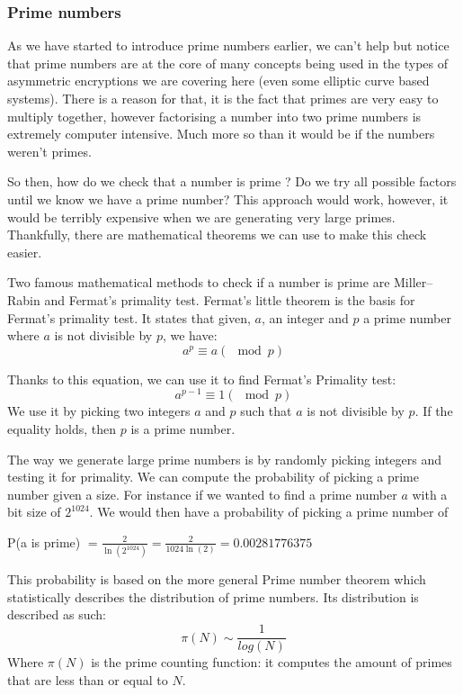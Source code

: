 \documentclass[conference]{IEEEtran}
\begin{document}
\subsubsection*{Prime numbers}
As we have started to introduce prime numbers earlier, we can't help 
but notice that prime numbers are at the core of many concepts being
used in the types of asymmetric encryptions we are covering here 
(even some elliptic curve based systems). 
There is a reason for that, it is the fact that primes are very easy to 
multiply together, however factorising a number into two prime numbers is 
extremely computer intensive. Much more so than it would be if the numbers 
weren't primes. 

So then, how do we check that a number is prime ? Do we try all possible factors
until we know we have a prime number? This approach would work, however, it 
would be terribly expensive when we are generating very large primes.
Thankfully, there are mathematical theorems we can use to make this check easier.

Two famous mathematical methods to check if a number is prime 
are Miller–Rabin and Fermat's primality test. 
Fermat's little theorem is the basis for Fermat's primality test. It states that
given, $a$, an integer and $p$ a prime number where $a$ is not divisible by $p$, we have:
\begin{equation*}
    a^{p} \equiv a (\mod p)
\end{equation*}

Thanks to this equation, we can use it to find Fermat's Primality test: 
\begin{equation*}
    a^{p - 1} \equiv 1 (\mod p)
\end{equation*}
We use it by picking two integers $a$ and $p$ such that $a$ is not divisible by $p$.
If the equality holds, then $p$ is a prime number.

The way we generate large prime numbers is by randomly picking integers and testing it for primality.
We can compute the probability of picking a prime number given a size. For instance if we wanted to 
find a prime number $a$ with a bit size of $2^{1024}$. We would then have a probability of picking a prime
number of \\
\begin{center}
    P(a is prime) $= \frac{2}{\ln(2^{1024})} = \frac{2}{1024\ln(2)} = 0.00281776375$
\end{center}
This probability is based on the more general Prime number theorem which statistically describes the distribution of prime numbers.
Its distribution is described as such:
\begin{equation*}
    \pi(N) \sim \frac{1}{log(N)}
\end{equation*}
Where $\pi(N)$ is the prime counting function: it computes the amount of primes
that are less than or equal to $N$.
\end{document}
